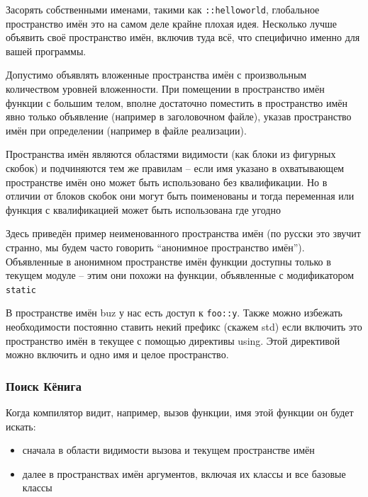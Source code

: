 \documentclass[a4paper,12pt,oneside]{article}
\begin{document}
Засорять собственными именами, такими как \lstinline!::helloworld!, глобальное пространство имён это на самом деле крайне плохая идея. Несколько лучше объявить своё пространство имён, включив туда всё, что специфично именно для вашей программы.



Допустимо объявлять вложенные пространства имён с произвольным количеством уровней вложенности. При помещении в пространство имён функции с большим телом, вполне достаточно поместить в пространство имён явно только объявление (например в заголовочном файле), указав пространство имён при определении (например в файле реализации).



Пространства имён являются областями видимости (как блоки из фигурных скобок) и подчиняются тем же правилам – если имя указано в охватывающем пространстве имён оно может быть использовано без квалификации. Но в отличии от блоков скобок они могут быть поименованы и тогда переменная или функция с квалификацией может быть использована где угодно



Здесь приведён пример неименованного пространства имён (по русски это звучит странно, мы будем часто говорить ``анонимное пространство имён''). Объявленные в анонимном пространстве имён функции доступны только в текущем модуле -- этим они похожи на функции, объявленные с модификатором \lstinline!static!

В пространстве имён buz у нас есть доступ к \lstinline!foo::y!. Также можно избежать необходимости постоянно ставить некий префикс (скажем std) если включить это пространство имён в текущее с помощью директивы using. Этой директивой можно включить и одно имя и целое пространство.

\subsubsection{Поиск Кёнига}

Когда компилятор видит, например, вызов функции, имя этой функции он будет искать:
\begin{itemize}
\item
сначала в области видимости вызова и текущем пространстве имён
\item
далее в пространствах имён аргументов, включая их классы и все базовые классы
\end{itemize}
\end{document}
